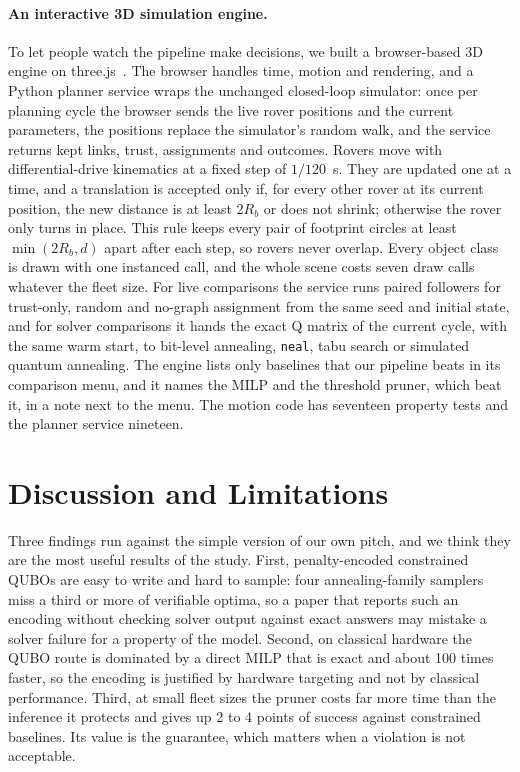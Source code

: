 \documentclass[11pt]{article}
\newcommand{\code}[1]{\texttt{#1}}
\begin{document}
\paragraph{An interactive 3D simulation engine.}
To let people watch the pipeline make decisions, we built a browser-based 3D
engine on three.js~\cite{threejs}. The browser handles time, motion and
rendering, and a Python planner service wraps the unchanged closed-loop
simulator: once per planning cycle the browser sends the live rover positions
and the current parameters, the positions replace the simulator's random walk,
and the service returns kept links, trust, assignments and outcomes. Rovers
move with differential-drive kinematics at a fixed step of $1/120$~s. They are
updated one at a time, and a translation is accepted only if, for every other
rover at its current position, the new distance is at least $2R_b$ or does not
shrink; otherwise the rover only turns in place. This rule keeps every pair
of footprint circles at least $\min(2R_b,d)$ apart after each step, so rovers
never overlap. Every object class is drawn with one instanced call, and the
whole scene costs seven draw calls whatever the fleet size. For live
comparisons the service runs paired followers for trust-only, random and
no-graph assignment from the same seed and initial state, and for solver
comparisons it hands the exact Q matrix of the current cycle, with the same
warm start, to bit-level annealing, \code{neal}, tabu search or simulated
quantum annealing. The engine lists only baselines that our pipeline beats in
its comparison menu, and it names the MILP and the threshold pruner, which
beat it, in a note next to the menu. The motion code has seventeen property
tests and the planner service nineteen.

\section{Discussion and Limitations}
\label{sec:discussion}

Three findings run against the simple version of our own pitch, and we think
they are the most useful results of the study. First, penalty-encoded
constrained QUBOs are easy to write and hard to sample: four annealing-family
samplers miss a third or more of verifiable optima, so a paper that reports
such an encoding without checking solver output against exact answers may
mistake a solver failure for a property of the model. Second, on classical
hardware the QUBO route is dominated by a direct MILP that is exact and about
100 times faster, so the encoding is justified by hardware targeting and not
by classical performance. Third, at small fleet sizes the pruner costs far
more time than the inference it protects and gives up 2 to 4 points of
success against constrained baselines. Its value is the guarantee, which
matters when a violation is not acceptable.
\end{document}
